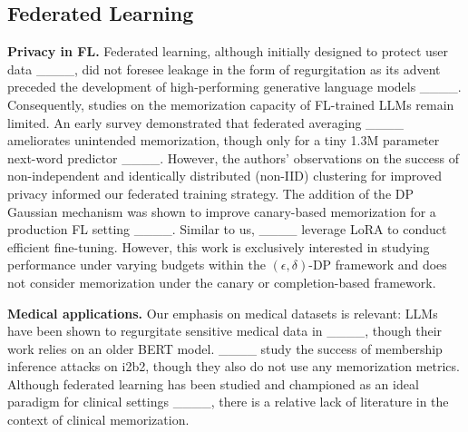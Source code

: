 \subsection{Federated Learning}

\textbf{Privacy in FL.} Federated learning, although initially designed to protect user data ____, did not foresee leakage in the form of regurgitation as its advent preceded the development of high-performing generative language models ____. Consequently, studies on the memorization capacity of FL-trained LLMs remain limited. An early survey demonstrated that federated averaging ____ ameliorates unintended memorization, though only for a tiny 1.3M parameter next-word predictor ____. However, the authors' observations on the success of non-independent and identically distributed (non-IID) clustering for improved privacy informed our federated training strategy. The addition of the DP Gaussian mechanism was shown to improve canary-based memorization for a production FL setting ____. Similar to us, ____ leverage LoRA to conduct efficient fine-tuning. However, this work is exclusively interested in studying performance under varying budgets within the $(\epsilon, \delta)$-DP framework and does not consider memorization under the canary or completion-based framework.

\textbf{Medical applications.} Our emphasis on medical datasets is relevant: LLMs have been shown to regurgitate sensitive medical data in ____, though their work relies on an older BERT model. 
____ study the success of membership inference attacks on i2b2, though they also do not use any memorization metrics. Although federated learning has been studied and championed as an ideal paradigm for clinical settings ____, there is a relative lack of literature in the context of clinical memorization.